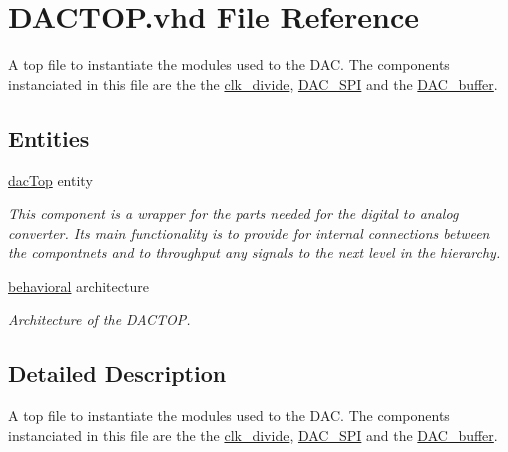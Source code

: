 \hypertarget{DACTOP_8vhd}{\section{D\-A\-C\-T\-O\-P.\-vhd File Reference}
\label{DACTOP_8vhd}
}


A top file to instantiate the modules used to the D\-A\-C. The components instanciated in this file are the the \hyperlink{classclk__divide}{clk\-\_\-divide}, \hyperlink{classDAC__SPI}{D\-A\-C\-\_\-\-S\-P\-I} and the \hyperlink{classDAC__buffer}{D\-A\-C\-\_\-buffer}.  


\subsection*{Entities}
\begin{DoxyCompactItemize}
\item 
\hyperlink{classdacTop}{dac\-Top} entity
\begin{DoxyCompactList}\small\item\em This component is a wrapper for the parts needed for the digital to analog converter. Its main functionality is to provide for internal connections between the compontnets and to throughput any signals to the next level in the hierarchy. \end{DoxyCompactList}\item 
\hyperlink{classdacTop_1_1behavioral}{behavioral} architecture
\begin{DoxyCompactList}\small\item\em Architecture of the D\-A\-C\-T\-O\-P. \end{DoxyCompactList}\end{DoxyCompactItemize}


\subsection{Detailed Description}
A top file to instantiate the modules used to the D\-A\-C. The components instanciated in this file are the the \hyperlink{classclk__divide}{clk\-\_\-divide}, \hyperlink{classDAC__SPI}{D\-A\-C\-\_\-\-S\-P\-I} and the \hyperlink{classDAC__buffer}{D\-A\-C\-\_\-buffer}. 